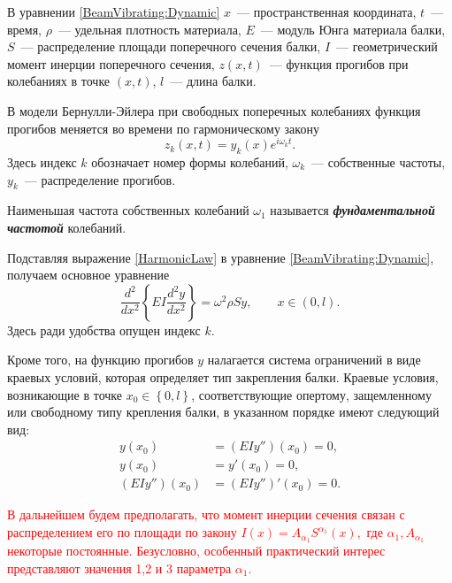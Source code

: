 В уравнении \eqref{BeamVibrating:Dynamic}
$x$~--- пространственная координата,
$t$~--- время,
$\rho$~--- удельная плотность материала,
$E$~--- модуль Юнга материала балки,
$S$~--- распределение площади поперечного сечения балки,
$I$~--- геометрический момент инерции поперечного сечения,
$z(x,t)$~--- функция прогибов при колебаниях в точке $(x, t)$,
$l$~--- длина балки.
%
%
%
\par
В модели Бернулли-Эйлера
при свободных поперечных колебаниях функция прогибов меняется во времени по гармоническому закону
\cite{book:Timoshenko}
\begin{equation}
\label{HarmonicLaw}
z_k(x, t) = y_k(x) e^{i \omega_k t}.
\end{equation}
%
%
%
Здесь индекс $k$ обозначает номер формы колебаний,
$\omega_k$~--- собственные частоты, $y_k$~--- распределение прогибов.
%
%
%
\begin{definition}
Наименьшая частота собственных колебаний $\omega_1$ называется
\textbf{\emph{фундаментальной частотой}} колебаний.
\end{definition}
%
%
%
\par
Подставляя выражение
\eqref{HarmonicLaw} в уравнение
\eqref{BeamVibrating:Dynamic},
получаем основное уравнение
\begin{equation}
\label{BeamVibrating:Dimensional}
\frac{d^2}{dx^2} \left\{EI\frac{d^2 y}{dx^2} \right\} = \omega^2 \rho S y,
\qquad
x \in (0, l).
\end{equation}
%
%
%
Здесь ради удобства опущен индекс $k$.
%
%
%
\par
Кроме того, на функцию прогибов
$y$
налагается система ограничений в виде краевых условий,
которая определяет тип закрепления балки.
%
%
%
Краевые условия, возникающие в точке $x_0 \in \left\{0,l\right\}$, соответствующие опертому, защемленному или свободному типу крепления балки, в указанном порядке имеют следующий вид:
\[
\begin{aligned}
y(x_0) &= (EIy'')(x_0) = 0,
\\
y(x_0) &= y'(x_0) = 0,
\\
(EI y'')(x_0) &= \left(EI y''\right)'(x_0) = 0.
\end{aligned}
\]
%
%
%
\par
\textcolor{red}{
В дальнейшем будем предполагать, что момент инерции сечения связан с распределением его по площади по закону 
\( I(x) = A_{\alpha_1}S^{\alpha_1}(x),\) где \({\alpha_1}, A_{\alpha_1}\) некоторые постоянные. Безусловно, особенный практический интерес представляют значения 1,2 и 3 параметра \(\alpha_1\).}
%
